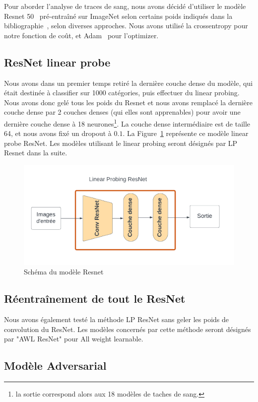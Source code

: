 \documentclass[a4paper]{article}
\begin{document}
Pour aborder l'analyse de traces de sang, nous avons décidé d'utiliser le modèle Resnet 50~\cite{ResNet} pré-entraîné sur ImageNet selon certains poids indiqués dans la bibliographie~\cite{torchvision}, selon diverses approches. Nous avons utilisé la crossentropy pour notre fonction de coût, et Adam~\cite{adam} pour l'optimizer.

\subsection{ResNet linear probe}
Nous avons dans un premier temps retiré la dernière couche dense du modèle, qui était destinée à classifier sur 1000 catégories, puis effectuer du linear probing. Nous avons donc gelé tous les poids du Resnet et nous avons remplacé la dernière couche dense par 2 couches denses (qui elles sont apprenables) pour avoir une dernière couche dense à 18 neurones\footnote{la sortie correspond alors aux 18 modèles de taches de sang.}. La couche dense intermédiaire est de taille 64, et nous avons fixé un dropout à $0.1$. La Figure~\ref{fig:resnet} représente ce modèle linear probe ResNet. Les modèles utilisant le linear probing seront désignés par LP Resnet dans la suite.

\begin{figure}[ht]
    \centering
    \includegraphics[width=0.7\linewidth]{../asset/Resnet.png}
    \caption{Schéma du modèle Resnet}
    \label{fig:resnet}
\end{figure}

\subsection{Réentraînement de tout le ResNet}
Nous avons également testé la méthode LP ResNet sans geler les poids de convolution du ResNet. Les modèles concernés par cette méthode seront désignés par "AWL ResNet" pour All weight learnable.

\subsection{Modèle Adversarial}
\end{document}
